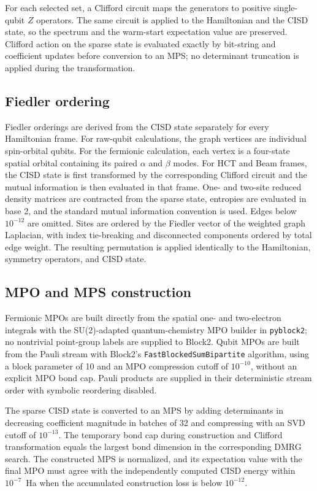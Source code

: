\documentclass[a4paper,onecolumn,10pt]{article}
\begin{document}
For each selected set, a Clifford circuit maps the generators to positive
single-qubit $Z$ operators.  The same circuit is applied to the Hamiltonian and
the CISD state, so the spectrum and the warm-start expectation value are
preserved.  Clifford action on the sparse state is evaluated exactly by
bit-string and coefficient updates before conversion to an MPS; no determinant
truncation is applied during the transformation.

\subsection{Fiedler ordering}

Fiedler orderings are derived from the CISD state separately for every
Hamiltonian frame.  For raw-qubit calculations, the graph vertices are
individual spin-orbital qubits.  For the fermionic calculation, each vertex is
a four-state spatial orbital containing its paired $\alpha$ and $\beta$ modes.
For HCT and Beam frames, the CISD state is first transformed by the
corresponding Clifford circuit and the mutual information is then evaluated in
that frame.  One- and two-site reduced density matrices are contracted from the
sparse state, entropies are evaluated in base 2, and the standard mutual
information convention is used.  Edges below $10^{-12}$ are omitted.  Sites
are ordered by the Fiedler vector of the weighted graph Laplacian, with index
tie-breaking and disconnected components ordered by total edge weight.  The
resulting permutation is applied identically to the Hamiltonian, symmetry
operators, and CISD state.

\subsection{MPO and MPS construction}

Fermionic MPOs are built directly from the spatial one- and two-electron
integrals with the SU(2)-adapted quantum-chemistry MPO builder in
\texttt{pyblock2}; no nontrivial point-group labels are supplied to Block2.
Qubit MPOs are built from the Pauli stream with Block2's
\texttt{FastBlockedSumBipartite} algorithm, using a block parameter of 10 and
an MPO compression cutoff of $10^{-10}$, without an explicit MPO bond cap.
Pauli products are supplied in their deterministic stream order with symbolic
reordering disabled.

The sparse CISD state is converted to an MPS by adding determinants in
decreasing coefficient magnitude in batches of 32 and compressing with an SVD
cutoff of $10^{-13}$.  The temporary bond cap during construction and Clifford
transformation equals the largest bond dimension in the corresponding DMRG
search.  The constructed MPS is normalized, and its expectation value with
the final MPO must agree with the independently computed CISD energy within
$10^{-7}$~Ha when the accumulated construction loss is below $10^{-12}$.
\end{document}

